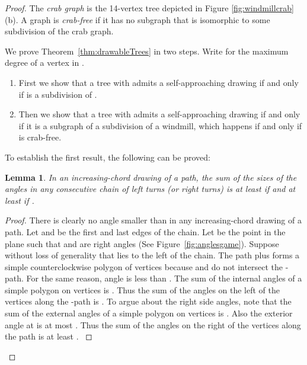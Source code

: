 \documentclass[11pt]{article}
\newtheorem{lemma}[theorem]{Lemma}
\newcommand{\changeA}[1]{{#1}}
\newcommand{\changeAL}[1]{{#1}}
\begin{document}
\begin{proof}
The \emph{crab graph} is the 14-vertex tree depicted in Figure \ref{fig:windmillcrab}(b).
A graph  is \emph{crab-free} if it has no subgraph that is isomorphic to some subdivision of the crab graph.

We prove Theorem~\ref{thm:drawableTrees} in two steps.  Write  for the maximum degree of a vertex in .
\begin{enumerate}
\item First we show that a tree  with  admits a self-approaching drawing if and only if  is a subdivision of .
\item Then we show that a tree  with  admits a self-approaching drawing if and only if it is a
\changeAL{subgraph of a} subdivision of a windmill, which happens if and only if  is crab-free.
\end{enumerate}

To establish the first result, the following can be proved:\begin{lemma}
\label{pathdegree}
In an increasing-chord drawing of a path, the sum of the sizes of the angles in any consecutive chain of  left turns (or right turns) is at least  if  and at least  if .
\end{lemma}
\begin{proof}
There is clearly no angle smaller than  in any increasing-chord drawing of a path. Let  and  be the first and last edges of the chain. Let  be the point in the plane such that
  and
  are right angles (See Figure~\ref{fig:anglesgame}).
\changeA{Suppose without loss of generality that  lies to the left of the chain.
The path plus  forms a simple counterclockwise polygon of  vertices because  and  do not intersect the -path.
For the same reason,
angle  is less than .
The sum of the internal angles of a simple polygon on  vertices is .  Thus the sum of the angles on the left of the vertices along the -path is .
To argue about the right side angles, note that the sum of the external angles of a simple polygon on  vertices is .  Also the exterior angle at  is at most .  Thus the sum of the angles on the right of the vertices along the  path is at least .
}


\end{proof}
\end{proof}
\end{document}
